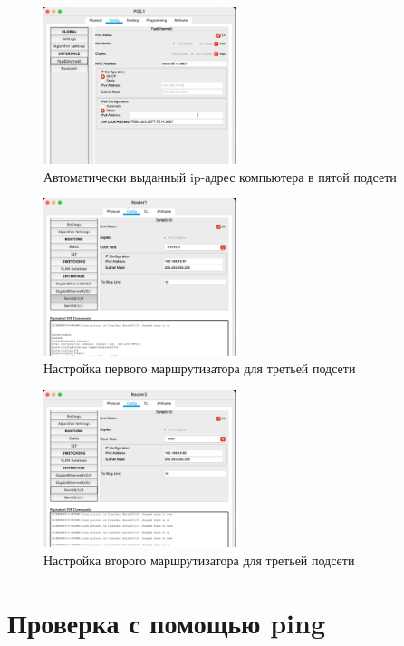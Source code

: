 \begin{figure}[H]
    \centering
    \includegraphics[width=0.5\textwidth]{img/content/PC_5.png}
    \caption{Автоматически выданный ip-адрес компьютера в пятой подсети}
\end{figure}

\begin{figure}[H]
    \centering
    \includegraphics[width=0.5\textwidth]{img/content/DHCP_3_1.png}
    \caption{Настройка первого маршрутизатора для третьей подсети}
\end{figure}

\begin{figure}[H]
    \centering
    \includegraphics[width=0.5\textwidth]{img/content/DHCP_3_2.png}
    \caption{Настройка второго маршрутизатора для третьей подсети}
\end{figure}

\section{Проверка с помощью ping}

